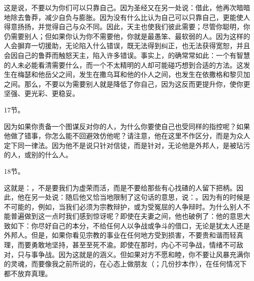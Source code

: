 这是说，不要以为你们可以只靠自己。因为圣经又在另一处说：借此，他再次暗暗地除去鲁莽，减少自负与膨胀。因为没有什么比认为自己可以只靠自己，更能使人得意扬扬，并觉得自己与众不同。因此，天主也使我们彼此需要；尽管你聪明，你仍需要别人；但如果你认为你不需要他，你就是最愚笨、最软弱的人。因为这样的人会摒弃一切援助，无论陷入什么错误，既无法得到纠正，也无法获得宽恕，并且会因自己的鲁莽而触怒天主，陷入许多错误。事实上，的确常常如此：一个有智慧的人未必能看清需要什么，而一个不太精明的人却可能碰巧想到合适的方法。这发生在梅瑟和他岳父之间，发生在撒乌耳和他的仆人之间，也发生在依撒格和黎贝加之间。那么，不要以为需要别人就是降低了你自己，因为这反而更提升你，使你更坚强、更光彩、更稳妥。\par

17节。\par

因为如果你责备一个图谋反对你的人，为什么你要使自己也受同样的指控呢？如果他做了错事，你怎么能不回避效仿他呢？请注意，他在这里不作区分，而是为众人定下同一律法。因为他不是说只针对信徒，而是针对，无论他是外邦人，是被玷污的人，或别的什么人。\par

18节。\par

这就是：，不是要我们为虚荣而活，而是不要给那些有心找碴的人留下把柄。因此，他在另一处说：随后他又恰当地限制了这句话的意思，说：。因为有的时候是不可能的，例如，当我们必须为宗教辩护，或为受冤屈的人争辩时。为什么别人不能普遍做到这一点时我们感到惊讶呢？即使在夫妻之间，他也破例了：他的意思大致如下：你尽好自己的本分，不给任何人以争战或争斗的借口，无论是犹太人还是外邦人。但是，如果你看见宗教的事业在任何地方受到损害，不要贵和谐而轻真理，而要勇敢地坚持，甚至至死不渝。即使在那时，内心不可争战，情绪不可敌对，只与事争战。因为这就是的涵义。但如果对方不愿和睦，你不要让风暴充满你的灵魂，而要像我之前所说的，在心态上做朋友（；几份抄本作），在任何情况下都不放弃真理。\par

